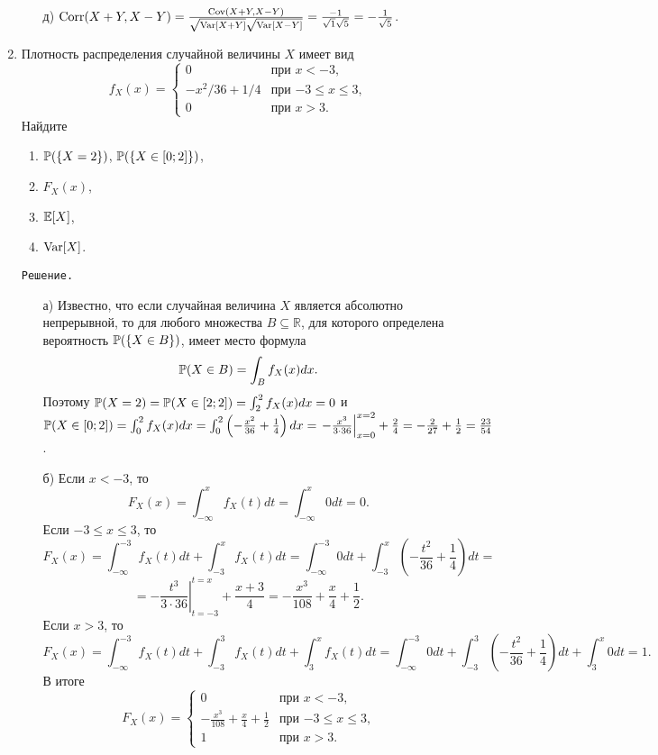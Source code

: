 \begin{enumerate}
\begin{enumerate}
\item[д)] $\Corr(X+Y, X-Y) = \frac{\Cov(X+Y, X-Y)}{\sqrt{\Var[X+Y]}\sqrt{\Var[X-Y]}} = \frac{-1}{\sqrt{1}\sqrt{5}} = -\frac{1}{\sqrt{5}}$.
\end{enumerate}
\item %
Плотность распределения случайной величины $X$ имеет вид
\[
f_X(x) =          \begin{cases}
                     0     &   \text{при $x < -3$,} \\
                     -x^{2}/36 + 1/4   &   \text{при $-3 \leq x \leq 3$,} \\
                     0     &   \text{при $x > 3$.}
                  \end{cases}
\]
Найдите
\begin{enumerate}
  \item $\P(\{X=2\})$, $\P(\{X \in [0;2]\})$,
  \item $F_X(x)$,
  \item $\E[X]$,
  \item $\Var[X]$.
\end{enumerate}

\verb"Решение."
\begin{enumerate}
\item[а)] Известно, что если случайная величина $X$ является абсолютно непрерывной, то для любого множества $B \subseteq \mathbb{R}$, для которого определена вероятность $\P(\{X \in B\})$, имеет место формула
\[
\P(X \in B) = \int_{B}f_X(x)dx.
\]
Поэтому $\P(X = 2) = \P(X \in [2;2]) = \int_{2}^{2}f_X(x)dx = 0$ и $\P(X \in [0;2]) = \int_{0}^{2}f_X(x)dx = \int_{0}^{2}\left(-\frac{x^2}{36} + \frac{1}{4}\right)dx = \left.-\frac{x^3}{3\cdot36}\right|_{x=0}^{x=2} + \frac{2}{4} = -\frac{2}{27} + \frac{1}{2} = \frac{23}{54}$.

\item[б)] Если $x < -3$, то
\[
F_X(x) = \int_{-\infty}^{x}f_X(t)dt = \int_{-\infty}^{x}0dt = 0 \text{.}
\]
Если $-3 \leq x \leq 3$, то
\[
F_X(x) = \int_{-\infty}^{-3}f_X(t)dt + \int_{-3}^{x}f_X(t)dt= \int_{-\infty}^{-3}0dt + \int_{-3}^{x}\left(-\frac{t^2}{36} + \frac{1}{4}\right)dt =
\]
\[
= -\left.\frac{t^3}{3\cdot36}\right|_{t=-3}^{t=x} + \frac{x+3}{4} = -\frac{x^3}{108} + \frac{x}{4} + \frac{1}{2} \text{.}
\]
Если $x > 3$, то
\[
F_X(x) = \int_{-\infty}^{-3}f_X(t)dt + \int_{-3}^{3}f_X(t)dt + \int_{3}^{x}f_X(t)dt = \int_{-\infty}^{-3}0dt + \int_{-3}^{3}\left(-\frac{t^2}{36} + \frac{1}{4}\right)dt + \int_{3}^{x}0dt = 1 \text{.}
\]
В итоге
\[
F_X(x) =
                 \begin{cases}
                     0                   &   \text{при $x < -3$,} \\
                     -\frac{x^3}{108} + \frac{x}{4} + \frac{1}{2}   &   \text{при $-3 \leq x \leq 3$,} \\
                     1                   &   \text{при $x > 3$.}
                  \end{cases}
\]


\end{enumerate}
\end{enumerate}
